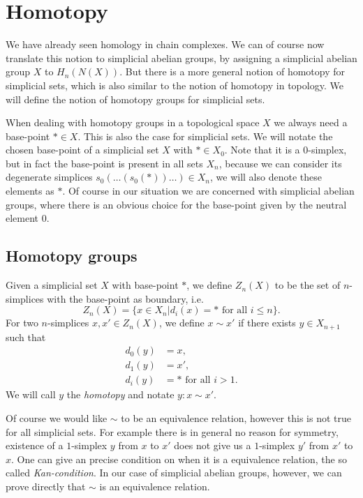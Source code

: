 \section{Homotopy}
\label{sec:Homotopy}

We have already seen homology in chain complexes. We can of course now translate this notion to simplicial abelian groups, by assigning a simplicial abelian group $X$ to $H_n(N(X))$. But there is a more general notion of homotopy for simplicial sets, which is also similar to the notion of homotopy in topology. We will define the notion of homotopy groups for simplicial sets.

When dealing with homotopy groups in a topological space $X$ we always need a base-point $\ast \in X$. This is also the case for simplicial sets. We will notate the chosen base-point of a simplicial set $X$ with $\ast \in X_0$. Note that it is a $0$-simplex, but in fact the base-point is present in all sets $X_n$, because we can consider its degenerate simplices $s_0(\ldots(s_0(\ast))\ldots) \in X_n$, we will also denote these elements as $\ast$. Of course in our situation we are concerned with simplicial abelian groups, where there is an obvious choice for the base-point given by the neutral element $0$.

\subsection{Homotopy groups}
\begin{definition}
	Given a simplicial set $X$ with base-point $\ast$, we define $Z_n(X)$ to be the set of $n$-simplices with the base-point as boundary, i.e.
	$$ Z_n(X) = \{ x \in X_n | d_i(x) = \ast \text{ for all } i \leq n \}. $$
	For two $n$-simplices $x, x' \in Z_n(X)$, we define $x \sim x'$ if there exists $y \in X_{n+1}$ such that
	\begin{align}
		d_0(y) &= x, \\
		d_1(y) &= x', \\
		d_i(y) &= \ast \text{ for all } i > 1.
	\end{align}
	We will call $y$ the \emph{homotopy} and notate $y: x \sim x'$.
\end{definition}

Of course we would like $\sim$ to be an equivalence relation, however this is not true for all simplicial sets. For example there is in general no reason for symmetry, existence of a $1$-simplex $y$ from $x$ to $x'$ does not give us a $1$-simplex $y'$ from $x'$ to $x$. One can give an precise condition on when it is a equivalence relation, the so called \emph{Kan-condition}. In our case of simplicial abelian groups, however, we can prove directly that $\sim$ is an equivalence relation.

